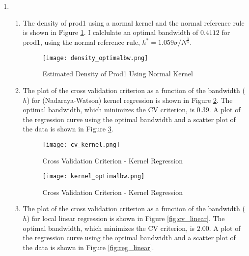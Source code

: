 \documentclass[]{report}
\newcommand{\0}{\bv{0}}
\newcommand{\1}{\bv{1}}
\begin{document}
\begin{enumerate}[1.]
\begin{enumerate}
\end{enumerate}

\item

\begin{enumerate}
	\item
	
	The density of prod1 using a normal kernel and the normal reference rule is shown in Figure \ref{fig:density}. I calclulate an optimal bandwidth of $ 0.4112$ for prod1, using the normal reference rule,  $h^* = 1.059 \sigma / N^{\frac{1}{5}}$.

\begin{figure}[hbtp]
	\begin{center}
		\caption{Estimated Density of Prod1 Using Normal Kernel}
		\label{fig:density}
		\texttt{[image: density\_optimalbw.png]}
	\end{center}
\end{figure}

\item

The plot of the cross validation criterion as a function of the bandwidth ($h$) for (Nadaraya-Watson) kernel regression is shown in Figure \ref{fig:cv_kernel}. The optimal bandwidth, which minimizes the CV criterion, is $0.39$. A plot of the regression curve using the optimal bandwidth and a scatter plot of the data is shown in Figure \ref{fig:reg_kernel}.


\begin{figure}[hbtp]
	\begin{center}
		\caption{Cross Validation Criterion - Kernel Regression}
		\label{fig:cv_kernel}
		\texttt{[image: cv\_kernel.png]}
	\end{center}
\end{figure}


\begin{figure}[hbtp]
	\begin{center}
		\caption{Cross Validation Criterion - Kernel Regression}
		\label{fig:reg_kernel}
		\texttt{[image: kernel\_optimalbw.png]}
	\end{center}
\end{figure}


\item


The plot of the cross validation criterion as a function of the bandwidth ($h$) for local linear regression is shown in Figure \ref{fig:cv_linear}. The optimal bandwidth, which minimizes the CV criterion, is $2.00$. A plot of the regression curve using the optimal bandwidth and a scatter plot of the data is shown in Figure \ref{fig:reg_linear}.



\end{enumerate}
\end{enumerate}
\end{document}
